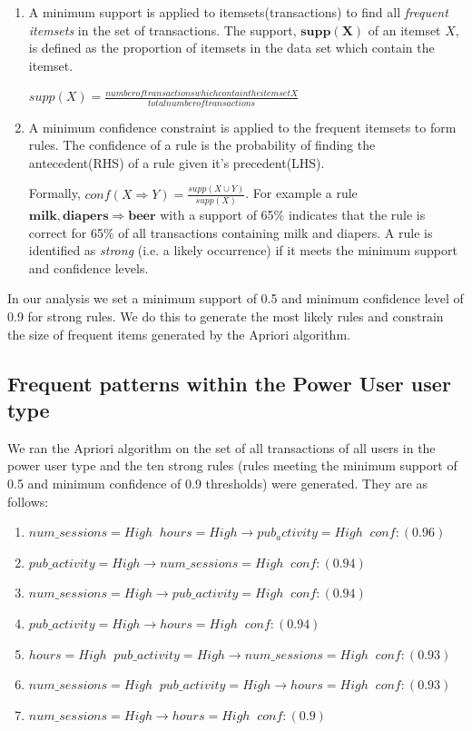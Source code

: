 \documentclass{acm_proc_article-sp}
\begin{document}
\begin{enumerate}
\item A minimum support is applied to itemsets(transactions) to find all \textit{frequent itemsets} in the set of transactions.
The support, $\mathbf{supp(X)}$ of an itemset $X$, is defined as the proportion of itemsets in the data set which contain the 
itemset.



$supp\left(X\right) = \frac{number of transactions which contain the itemset X}{total number of transactions}$



\item A minimum confidence constraint is applied to the frequent itemsets to form rules. The confidence of a rule is the probability of finding the antecedent(RHS) of a rule given it's precedent(LHS).

Formally, $conf(X \Longrightarrow Y) = \frac{supp\left(X \cup Y\right)}{supp\left(X\right)}$. 
For example a rule $\mathbf{milk,diapers \Longrightarrow {beer}}$ with a support of 65\% indicates that the rule is correct for 65\% of all transactions containing milk and diapers.
 A rule is identified as \textit{strong} (i.e. a likely occurrence) if it meets the minimum support and confidence levels.
\end{enumerate}

In our analysis we set a minimum support of 0.5 and minimum confidence level of 0.9 for strong rules. We do this to generate the most likely rules and constrain the size of frequent items generated by the Apriori algorithm.

\subsection {Frequent patterns within the Power User user type}
We ran the Apriori algorithm on the set of all transactions of all users in the power user type and the ten strong rules (rules meeting the minimum support of 0.5 and minimum confidence of 0.9 thresholds) were generated. They are as follows:

\begin{enumerate}
 \item $num\_sessions=High \;\; hours=High \longrightarrow pub_activity=High   \;\;conf:(0.96)$
 \item $pub\_activity=High \longrightarrow num\_sessions=High  \;\;  conf:(0.94)$
 \item $num\_sessions=High \longrightarrow pub\_activity=High   \;\; conf:(0.94)$
 \item $pub\_activity=High \longrightarrow hours=High  \;\;  conf:(0.94)$
 \item $hours=High \;\; pub\_activity=High \longrightarrow num\_sessions=High  \;\; conf:(0.93)$
 \item $num\_sessions=High \;\; pub\_activity=High \longrightarrow hours=High   \;\;conf:(0.93)$
 \item $num\_sessions=High  \longrightarrow hours=High \;\;  conf:(0.9)$
\end{enumerate}
\end{document}
